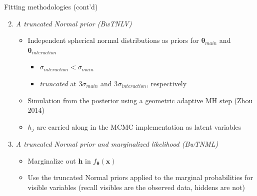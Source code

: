 \documentclass[ignorenonframetext,]{beamer}
\providecommand{\tightlist}{%
  \setlength{\itemsep}{0pt}\setlength{\parskip}{0pt}}
\theoremstyle{definition}
\begin{document}
\begin{frame}{Fitting methodologies (cont'd)}
\protect\hypertarget{fitting-methodologies-contd}{}

\begin{enumerate}
\setcounter{enumi}{1}
\tightlist
\item
  \emph{A truncated Normal prior (BwTNLV)}

  \begin{itemize}
  \tightlist
  \item
    Independent spherical normal distributions as priors for
    \(\boldsymbol \theta_{main}\) and
    \(\boldsymbol \theta_{interaction}\)

    \begin{itemize}
    \tightlist
    \item
      \(\sigma_{interaction} < \sigma_{main}\)
    \item
      \emph{truncated} at \(3\sigma_{main}\) and
      \(3\sigma_{interaction}\), respectively
    \end{itemize}
  \item
    Simulation from the posterior using a geometric adaptive MH step
    (Zhou 2014)
  \item
    \(h_j\) are carried along in the MCMC implementation as latent
    variables
  \end{itemize}
\item
  \emph{A truncated Normal prior and marginalized likelihood (BwTNML)}

  \begin{itemize}
  \tightlist
  \item
    Marginalize out \(\boldsymbol h\) in
    \(f_{\boldsymbol \theta}(\boldsymbol x)\)
  \item
    Use the truncated Normal priors applied to the marginal
    probabilities for visible variables (recall visibles are the
    observed data, hiddens are not)
  \end{itemize}
\end{enumerate}

\end{frame}
\end{document}
